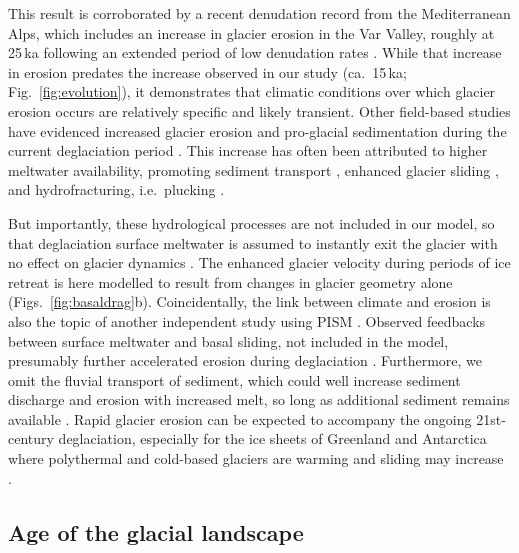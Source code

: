 \documentclass[esurf, manuscript]{copernicus}
\begin{document}
    This result is corroborated by a recent denudation record from the
    Mediterranean Alps, which includes an increase in glacier erosion in the
    Var Valley, roughly at 25\,ka following an extended period of low
    denudation rates \citep{Mariotti.etal.2021}. While that increase in
    erosion predates the increase observed in our study (ca.~15\,ka;
    Fig.~\ref{fig:evolution}), it demonstrates that climatic conditions
    over which glacier erosion occurs are relatively specific and likely
    transient. Other field-based studies have evidenced increased glacier
    erosion and pro-glacial sedimentation during the current deglaciation period
    \citep[e.g.,][]{Koppes.Montgomery.2009, Micheletti.Lane.2016,
    Lane.etal.2017, Bendixen.etal.2017}. This increase has often been
    attributed to higher meltwater availability, promoting sediment transport
    \citep{Delaney.Adhikari.2020}, enhanced glacier sliding
    \citep{Herman.etal.2011}, and hydrofracturing, i.e.~plucking
    \citep{Hallet.1996, Ugelvig.etal.2018, Hildes.etal.2004}.

    But importantly, these hydrological processes are not included in our
    model, so that deglaciation surface meltwater is assumed to instantly exit
    the glacier with no effect on glacier dynamics \citep[cf.][for comparison]
    {Werder.etal.2013, Iverson.2012, Ugelvig.etal.2018}. The enhanced glacier
    velocity during periods of ice retreat is here modelled to result from
    changes in glacier geometry alone (Figs.~\ref{fig:basaldrag}b).
    Coincidentally, the link between climate and erosion is also the topic of
    another independent study using PISM \citep{Lai.Anders.2021}.
    Observed feedbacks between
    surface meltwater and basal sliding, not included in the model, presumably
    further accelerated erosion during deglaciation \citep{Herman.etal.2011}.
    Furthermore, we omit the fluvial transport of sediment, which could well
    increase sediment discharge and erosion with increased melt, so long as
    additional sediment remains available \citep{Delaney.Adhikari.2020}. Rapid
    glacier erosion can be expected to accompany the ongoing 21st-century
    deglaciation, especially for the ice sheets of Greenland and
    Antarctica where polythermal and cold-based glaciers are warming and
    sliding may increase \citep[e.g.,][]{Moon.etal.2012, Mouginot.etal.2014,
    Overeem.etal.2017}.

\subsection{Age of the glacial landscape}
\end{document}
